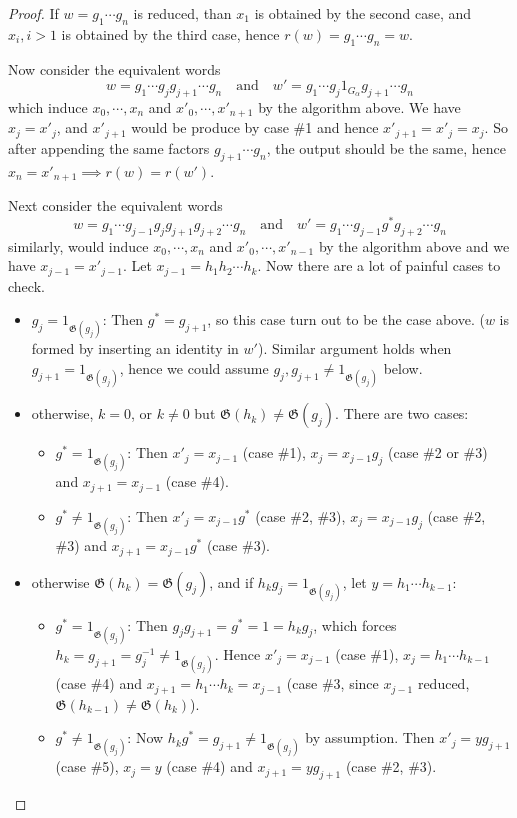 \documentclass[a4paper,titlepage]{article}
\theoremstyle{remark}
\theoremstyle{definition}
\theoremstyle{definition}
\theoremstyle{plain}
\newcommand{\gid}{\mathfrak{G}}
\begin{document}
\begin{proof}
    If $w = g_1 \cdots g_n$ is reduced, than $x_1$ is obtained by the second case, and $x_i, i > 1$ is
    obtained by the third case, hence $r(w) = g_1 \cdots g_n = w$.

    Now consider the equivalent words
    \[ w = g_1 \cdots g_j g_{j+1} \cdots g_n \quad\text{and}\quad w' = g_1 \cdots g_j 1_{G_\alpha} g_{j+1} \cdots g_n \]
    which induce $x_0, \cdots, x_n$ and $x'_0, \cdots, x'_{n+1}$ by the algorithm above.
    We have $x_j = x'_j$, and $x'_{j+1}$ would be produce by case \#1 and hence $x'_{j+1} = x'_j = x_j$.
    So after appending the same factors $g_{j+1} \cdots g_n$, the output should be the same, hence
    $x_n = x'_{n+1} \implies r(w) = r(w')$.

    Next consider the equivalent words
    \[ w = g_1 \cdots g_{j-1} g_j g_{j+1} g_{j+2} \cdots g_n 
      \quad\text{and}\quad w' = g_1 \cdots g_{j-1} g^* g_{j+2} \cdots g_n \]
    similarly, would induce $x_0, \cdots, x_n$ and $x'_0, \cdots, x'_{n-1}$ by the algorithm above and
    we have $x_{j-1} = x'_{j-1}$. Let $x_{j-1} = h_1 h_2 \cdots h_k$. 
    Now there are a lot of painful cases to check.
    \begin{itemize}
      \item $g_j = 1_{\gid(g_j)}$: Then $g^* = g_{j+1}$, so this case turn out to be the case above. ($w$
        is formed by inserting an identity in $w'$). Similar argument holds when $g_{j+1} = 1_{\gid(g_j)}$,
        hence we could assume $g_j, g_{j+1} \neq 1_{\gid(g_j)}$ below.
      \item otherwise, $k = 0$, or $k \neq 0$ but $\gid(h_k) \neq \gid(g_j)$. There are two cases:
        \begin{itemize}
          \item $g^* = 1_{\gid(g_j)}$: Then $x'_j = x_{j-1}$ (case \#1), $x_j = x_{j-1} g_j$ (case \#2 
            or \#3) and $x_{j+1} = x_{j-1}$ (case \#4).
          \item $g^* \neq 1_{\gid(g_j)}$: Then $x'_j = x_{j-1} g^*$ (case \#2, \#3),
            $x_j = x_{j-1} g_j$ (case \#2, \#3) and $x_{j+1} = x_{j-1} g^*$ (case \#3).
        \end{itemize}
      \item otherwise $\gid(h_k) = \gid(g_j)$, and if $h_k g_j = 1_{\gid(g_j)}$,
        let $y = h_1 \cdots h_{k-1}$:
        \begin{itemize}
          \item $g^* = 1_{\gid(g_j)}$: Then $g_j g_{j+1} = g^* = 1 = h_k g_j$, which forces
            $h_k = g_{j+1} = g^{-1}_j \neq 1_{\gid(g_j)}$.  
            Hence $x'_j = x_{j-1}$ (case \#1), $x_j = h_1 \cdots h_{k-1}$
            (case \#4) and $x_{j+1} = h_1 \cdots h_k = x_{j-1}$ (case \#3, since $x_{j-1}$ reduced, 
            $\gid(h_{k-1}) \neq \gid(h_k)$).
          \item $g^* \neq 1_{\gid(g_j)}$: 
            Now $h_k g^* = g_{j+1} \neq 1_{\gid(g_j)}$ by assumption. Then
              $x'_j = y g_{j+1}$ (case \#5), $x_j = y$ (case \#4) and $x_{j+1} = y g_{j+1}$ 
                (case \#2, \#3).
        \end{itemize}


\end{itemize}
\end{proof}
\end{document}
